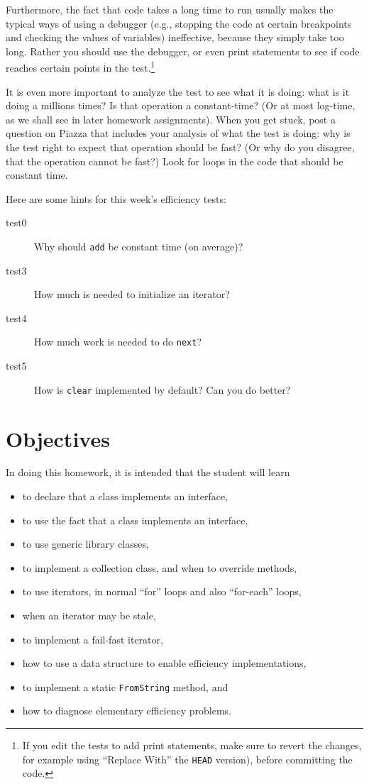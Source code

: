 \documentclass[11pt]{article}
\begin{document}
Furthermore, the fact that code takes a long time to run usually makes
the typical ways of using a debugger (e.g., stopping the code at certain
breakpoints and checking the values of variables) ineffective,
because they simply take too long.
Rather you should use the debugger, or even print statements to see if
code reaches certain points in the test.\footnote{If you edit the
  tests to add print statements, make sure to revert the changes, for
  example using ``Replace With'' the \texttt{HEAD} version), before
  committing the code.}

It is even more important to analyze the test to see what it is doing:
what is it doing a millions times?  Is that operation a constant-time?
(Or at most log-time, as we shall see in later homework assignments).
When you get stuck, post a question on Piazza that includes your analysis
of what the test is doing: why is the test right to expect that
operation should be fast?  (Or why do you disagree, that the operation
cannot be fast?) Look for loops in the code that should be constant time.

Here are some hints for this week's efficiency tests:
\begin{description}
\item[test0] Why should \texttt{add} be constant time (on average)?
\item[test3] How much is needed to initialize an iterator?
\item[test4] How much work is needed to do \texttt{next}?
\item[test5] How is \texttt{clear} implemented by default?  Can you
  do better?
\end{description}

\section{Objectives}

In doing this homework, it is intended that the student will learn
\begin{itemize}
\item to declare that a class implements an interface,
\item to use the fact that a class implements an interface,
\item to use generic library classes,
\item to implement a collection class, and when to override
  methods,
\item to use iterators, in normal ``for'' loops and also
  ``for-each'' loops,
\item when an iterator may be stale,
\item to implement a fail-fast iterator,
\item how to use a data structure to enable efficiency
  implementations,
\item to implement a static \texttt{FromString} method,
  and
\item how to diagnose elementary efficiency problems.
\end{itemize}
  
\end{document}
